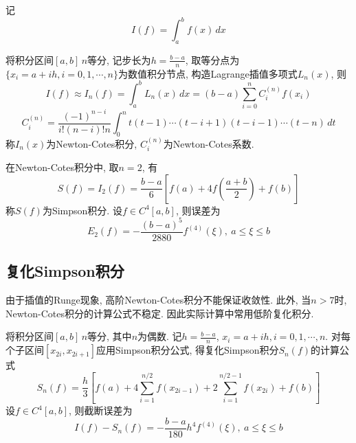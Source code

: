 \documentclass{nedsart}
\begin{document}
记\begin{equation}
    I(f) = \int_{a}^{b} f(x) \,dx
\end{equation}

将积分区间$[a,b]$\,$n$等分, 记步长为$h = \frac{b-a}{n}$, 取等分点为$\{x_i = a+ih, i = 0,1,\cdots ,n\}$为数值积分节点, 构造Lagrange插值多项式$L_n(x)$, 则
\begin{equation}
    I(f) \approx I_n(f) = \int_{a}^{b} L_n(x) \,dx = (b-a) \sum_{i=0}^n C_i^{(n)}f(x_i)
\end{equation}
\begin{equation}
    C_i^{(n)}= \frac{(-1)^{n-i}}{i!(n-i)!n} \int_{0}^{n} t(t-1) \cdots (t-i+1)(t-i-1) \cdots (t-n) \,dt
\end{equation}
称$I_n(x)$为Newton-Cotes积分, $C_i^{(n)}$为Newton-Cotes系数.



在Newton-Cotes积分中, 取$n = 2$, 有
\begin{equation}
    \label{simpson}
    S(f) = I_2(f) = \frac{b-a}{6} \left[f(a) + 4 f\left(\frac{a+b}{2}\right) + f(b)\right]
\end{equation}
称$S(f)$为Simpson积分. 设$f\in C^4{[a,b]}$, 则误差为
\begin{equation}
    E_2(f) = -\frac{(b-a)^5}{2880} f^{(4)}(\xi ),\ a \leq \xi \leq b
\end{equation}

\subsection{复化Simpson积分}

由于插值的Runge现象, 高阶Newton-Cotes积分不能保证收敛性. 此外, 当$n>7$时, Newton-Cotes积分的计算公式不稳定. 因此实际计算中常用低阶复化积分.

将积分区间$[a,b]$\,$n$等分, 其中$n$为偶数. 记$h = \frac{b-a}{n}$, $x_i = a+ih, i = 0,1,\cdots ,n$. 对每个子区间$[x_{2i},x_{2i+1}]$应用Simpson积分公式, 得复化Simpson积分$S_n(f)$的计算公式
\begin{equation}
    \label{csimpson}
    S_n(f) = \frac{h}{3} \left[f(a) + 4 \sum_{i=1}^{n/2} f(x_{2i-1}) +2 \sum_{i=1}^{n/2-1} f(x_{2i}) + f(b)\right]
\end{equation}
设$f\in C^4{[a,b]}$, 则截断误差为
\begin{equation}
    \label{serror1}
    I(f)-S_n(f) = -\frac{b-a}{180} h^4 f^{(4)}(\xi ),\ a \leq \xi \leq b
\end{equation}
\end{document}
